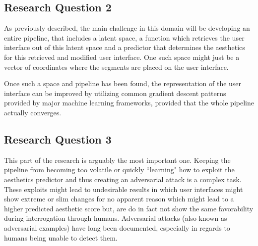 \documentclass[10pt,a4paper]{scrartcl} %
\begin{document}
\subsection{Research Question 2}
As previously described, the main challenge in this domain will be developing an entire pipeline, that includes a latent space, a function which retrieves the user interface out of this latent space and a predictor that determines the aesthetics for this retrieved and modified user interface. One such space might just be a vector of coordinates where the segments are placed on the user interface. 


Once such a space and pipeline has been found, the representation of the user interface can be improved by utilizing
common gradient descent patterns provided by major machine learning frameworks, provided that the whole pipeline actually converges.



%
%
%
\subsection{Research Question 3}
This part of the research is arguably the most important one. Keeping the pipeline from becoming too volatile or quickly ``learning" how to exploit the aesthetics predictor and thus creating an adversarial attack is a complex task. These exploits might lead to undesirable results in which user interfaces might show extreme or slim changes for no apparent reason which might lead to a higher predicted aesthetic score but, are do in fact not show the same favorability during interrogation through humans. Adversarial attacks (also known as adversarial examples) have long been documented, especially in regards to humans being unable to detect them. \cite{G_pfert_2020}
\end{document}
